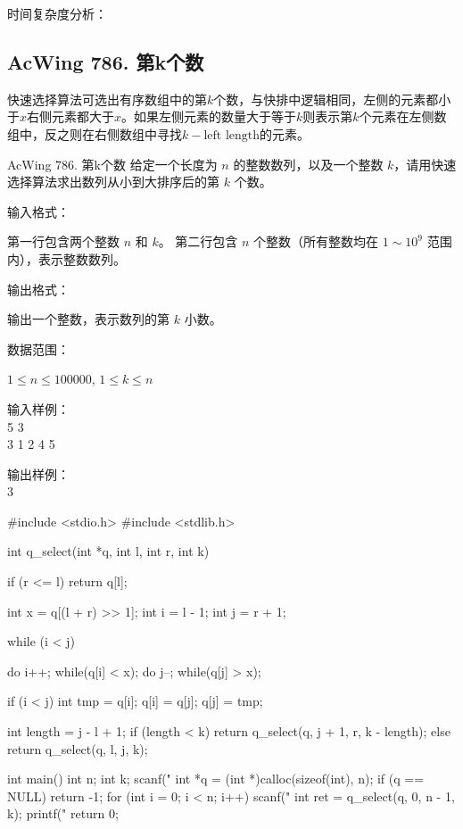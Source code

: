 时间复杂度分析：

\subsection{AcWing 786. 第k个数}
快速选择算法可选出有序数组中的第$k$个数，与快排中逻辑相同，左侧的元素都小于$x$右侧元素都大于$x$。如果左侧元素的数量大于等于$k$则表示第$k$个元素在左侧数组中，反之则在右侧数组中寻找$k-\text{left length}$的元素。

\begin{titledbox}{AcWing 786. 第k个数}
    给定一个长度为 $n$ 的整数数列，以及一个整数 $k$，请用快速选择算法求出数列从小到大排序后的第 $k$ 个数。

    输入格式：

    第一行包含两个整数 $n$ 和 $k$。
    第二行包含 $n$ 个整数（所有整数均在 $1 \sim 10^9$ 范围内），表示整数数列。

    输出格式：

    输出一个整数，表示数列的第 $k$ 小数。

    数据范围：

    $1 \le n \le 100000$,
    $1 \le k \le n$

    \begin{minipage}[t]{.5\textwidth}
        输入样例：\\
        5 3\\
        3 1 2 4 5
    \end{minipage}%
    \begin{minipage}[t]{.5\textwidth}
        输出样例：\\
        3
    \end{minipage}
\end{titledbox}


\begin{mycpptwocol}
    #include <stdio.h>
    #include <stdlib.h>

    int q_select(int *q, int l,
    int r, int k) {
        if (r <= l) {
            return q[l];
        }

        int x = q[(l + r) >> 1];
        int i = l - 1;
        int j = r + 1;

        while (i < j) {
            do i++; while(q[i] < x);
            do j--; while(q[j] > x);

            if (i < j) {
                int tmp = q[i];
                q[i] = q[j];
                q[j] = tmp;
            }
        }

        int length = j - l + 1;
        if (length < k) {
            return q_select(q, j + 1, r,
            k - length);
        } else {
            return q_select(q, l, j, k);
        }
    }

    int main()
        {
        int n;
        int k;
        scanf("%
        int *q = (int *)calloc(sizeof(int), n);
        if (q == NULL) {
            return -1;
        }
        for (int i = 0; i < n; i++) {
            scanf("%
        }
        int ret = q_select(q, 0, n - 1, k);
        printf("%
        return 0;
    }
\end{mycpptwocol}


